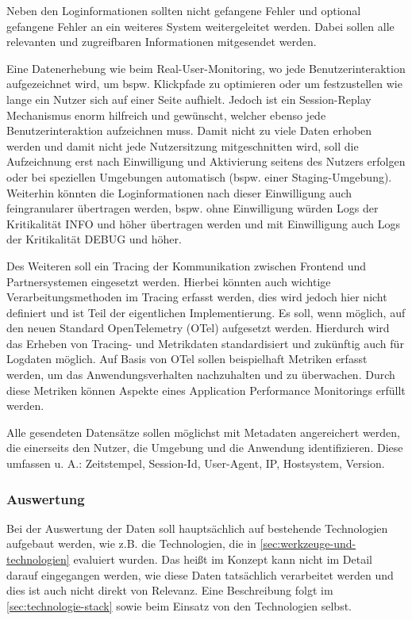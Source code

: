 	Neben den Loginformationen sollten nicht gefangene Fehler und optional gefangene Fehler an ein weiteres System weitergeleitet werden. Dabei sollen alle relevanten und zugreifbaren Informationen mitgesendet werden.
		
	Eine Datenerhebung wie beim Real-User-Monitoring, wo jede Benutzerinteraktion aufgezeichnet wird, um bspw. Klickpfade zu optimieren oder um festzustellen wie lange ein Nutzer sich auf einer Seite aufhielt. Jedoch ist ein Session-Replay Mechanismus enorm hilfreich und gewünscht, welcher ebenso jede Benutzerinteraktion aufzeichnen muss. Damit nicht zu viele Daten erhoben werden und damit nicht jede Nutzersitzung mitgeschnitten wird, soll die Aufzeichnung erst nach Einwilligung und Aktivierung seitens des Nutzers erfolgen oder bei speziellen Umgebungen automatisch (bspw. einer Staging-Umgebung). Weiterhin könnten die Loginformationen nach dieser Einwilligung auch feingranularer übertragen werden, bspw. ohne Einwilligung würden Logs der Kritikalität INFO und höher übertragen werden und mit Einwilligung auch Logs der Kritikalität DEBUG und höher.
		
	Des Weiteren soll ein Tracing der Kommunikation zwischen Frontend und Partnersystemen eingesetzt werden. Hierbei könnten auch wichtige Verarbeitungsmethoden im Tracing erfasst werden, dies wird jedoch hier nicht definiert und ist Teil der eigentlichen Implementierung. Es soll, wenn möglich, auf den neuen Standard OpenTelemetry (OTel) aufgesetzt werden. Hierdurch wird das Erheben von Tracing- und Metrikdaten standardisiert und zukünftig auch für Logdaten möglich. Auf Basis von OTel sollen beispielhaft Metriken erfasst werden, um das Anwendungsverhalten nachzuhalten und zu überwachen. Durch diese Metriken können Aspekte eines Application Performance Monitorings erfüllt werden.
		
	Alle gesendeten Datensätze sollen möglichst mit Metadaten angereichert werden, die einerseits den Nutzer, die Umgebung und die Anwendung identifizieren. Diese umfassen u. A.: Zeitstempel, Session-Id, User-Agent, IP, Hostsystem, Version.
		
	\subsubsection{Auswertung}
		
	Bei der Auswertung der Daten soll hauptsächlich auf bestehende Technologien aufgebaut werden, wie z.B. die Technologien, die in \autoref{sec:werkzeuge-und-technologien} evaluiert wurden. Das heißt im Konzept kann nicht im Detail darauf eingegangen werden, wie diese Daten tatsächlich verarbeitet werden und dies ist auch nicht direkt von Relevanz. Eine Beschreibung folgt im \autoref{sec:technologie-stack} sowie beim Einsatz von den Technologien selbst.
		
